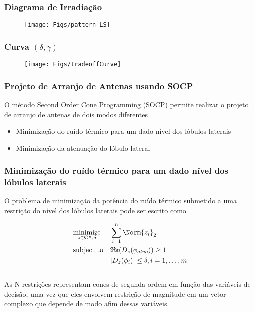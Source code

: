 \begin{frame}

\frametitle{Diagrama de Irradiação}
\begin{figure}
\centering
\texttt{[image: Figs/pattern\_LS]}
\end{figure}

\end{frame}

\begin{frame}
\frametitle{Curva $(\delta, \gamma)$}
\begin{figure}
\centering
\texttt{[image: Figs/tradeoffCurve]}
\end{figure}
\end{frame}

\begin{frame}
\frametitle{Projeto de Arranjo de Antenas usando SOCP}
O método Second Order Cone Programming (SOCP) permite realizar o projeto de arranjo de antenas de dois modos diferentes

\begin{itemize}
\item Minimização do ru\'ido térmico para um dado n\'ivel dos lóbulos laterais
\item Minimização da atenuação do lóbulo lateral 
\end{itemize}

\end{frame}

\begin{frame}
\frametitle{Minimização do ru\'ido térmico para um dado n\'ivel dos lóbulos laterais}

O problema de minimização da pot\^encia do ru\'ido térmico submetido a uma restrição do n\'ivel dos lóbulos laterais pode ser escrito como

\begin{equation*}
\begin{aligned}
& \underset{z \in \mathbf{C}^{n},\delta}{\text{minimize}}
&& \sum_{i = 1}^{n} \Norm{z_{i}}_{2} \\
& \text{subject to}
&& \mathfrak{Re}(D_{z}(\phi_{alvo})) \geq 1 \\
&
&& |D_{z}(\phi_{i})| \leq \delta, i = 1, \ldots, m
\end{aligned}
\end{equation*}
\\

As N restri\c{c}\~oes representam cones de segunda ordem em função das variáveis de decis\~ao, uma vez que eles envolvem restrição de magnitude em um vetor complexo que depende de modo afim dessas variáveis.

\end{frame}

